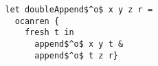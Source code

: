 \begin{lstlisting}
  let doubleAppend$^o$ x y z r =
    ocanren {
      fresh t in
        append$^o$ x y t &
        append$^o$ t z r}
  \end{lstlisting}
